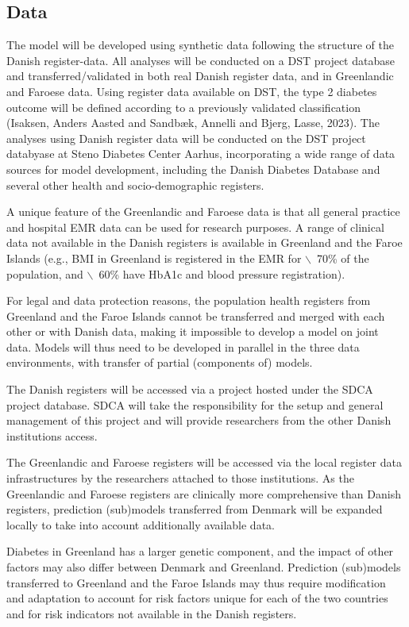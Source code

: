 \documentclass[11pt]{article}
\begin{document}
\subsection{Data}
\label{sec:orgc5d1927}
The model will be developed using synthetic data following the structure of the Danish register-data. All analyses will be conducted on a DST project database and transferred/validated in both real Danish register data, and in Greenlandic and Faroese data. Using register data available on DST, the type 2 diabetes outcome will be defined according to a previously validated classification (Isaksen, Anders Aasted and Sandb{\ae}k, Annelli and Bjerg, Lasse, 2023). The analyses using Danish register data will be conducted on the DST project databyase at Steno Diabetes Center Aarhus, incorporating a wide range of data sources for model development, including the Danish Diabetes Database and several other health and socio-demographic registers.

A unique feature of the Greenlandic and Faroese data is that all general practice and hospital EMR data can be used for research purposes. A range of clinical data not available in the Danish registers is available in Greenland and the Faroe Islands (e.g., BMI in Greenland is registered in the EMR for $\backslash$~70\% of the population, and $\backslash$~60\% have HbA1c and blood pressure registration).

For legal and data protection reasons, the population health registers from Greenland and the Faroe Islands cannot be transferred and merged with each other or with Danish data, making it impossible to develop a model on joint data. Models will thus need to be developed in parallel in the three data environments, with transfer of partial (components of) models.

The Danish registers will be accessed via a project hosted under the SDCA project database. SDCA will take the responsibility for the setup and general management of this project and will provide researchers from the other Danish institutions access.

The Greenlandic and Faroese registers will be accessed via the local register data infrastructures by the researchers attached to those institutions. As the Greenlandic and Faroese registers are clinically more comprehensive than Danish registers, prediction (sub)models transferred from Denmark will be expanded locally to take into account additionally available data.

Diabetes in Greenland has a larger genetic component, and the impact of other factors may also differ between Denmark and Greenland. Prediction (sub)models transferred to Greenland and the Faroe Islands may thus require modification and adaptation to account for risk factors unique for each of the two countries and for risk indicators not available in the Danish registers.
\end{document}
